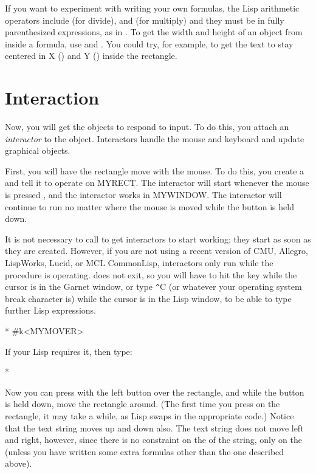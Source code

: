 If you want to experiment with writing your own formulas, the Lisp
arithmetic operators include  (for divide), and \pr{*} (for
multiply) and they must be in fully parenthesized expressions, as in
.
To get the width and height of an object from inside a
formula, use  and .  You could try, for example, to get the text to stay centered in
X () and Y () inside the rectangle.


\section{Interaction}

Now, you will get the objects to respond to input.  To do this, you attach
an {\it interactor} to the object.  Interactors handle the mouse and keyboard
and update graphical objects.

First, you will have the rectangle move with the mouse.  To do this, you
create a  and tell it to operate on MYRECT.
The interactor will start whenever the mouse is pressed ,
and the interactor works in MYWINDOW.  The interactor will continue to
run no matter where the mouse is moved while the button is held down.

It is not necessary to call
 to get interactors to start working; they start as soon as
they are created.  However, if you are not using a recent version of
CMU, Allegro, LispWorks, Lucid, or MCL CommonLisp, interactors only run
while the  procedure is operating.
 does not exit, so you will have to hit the  key
while the cursor is in the Garnet window, or type {\texttt \^}C (or
whatever your operating system break character is) while the cursor is in
the Lisp window, to be able to type further Lisp expressions.

\begin{programexample}
* 
\#k<MYMOVER>
\end{programexample}
If your Lisp requires it, then type:
\begin{programexample}
* 
\end{programexample}

Now you can press with the left button over the rectangle, and while the
button is held down, move the rectangle around.  (The first time you press
on the rectangle, it may take a while, as Lisp swaps in the appropriate code.)
Notice that the text
string moves up and down also.  The text string does not move left and
right, however, since there is no constraint on the  of the
string, only on the  (unless you have written some extra formulas
other than the one described above).

